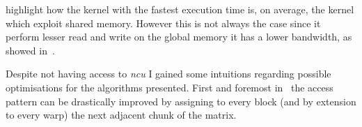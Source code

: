 \documentclass[conference]{IEEEtran}
\begin{document}
 highlight how the kernel with the fastest execution time is, on average, the kernel which exploit shared memory. However this is not always the case since it perform lesser read and write on the global memory it has a lower bandwidth, as showed in~.

Despite not having access to \emph{ncu} I gained some intuitions regarding possible optimisations for the algorithms presented. First and foremost in~ the access pattern can be drastically improved by assigning to every block (and by extension to every warp) the next adjacent chunk of the matrix.
\end{document}
